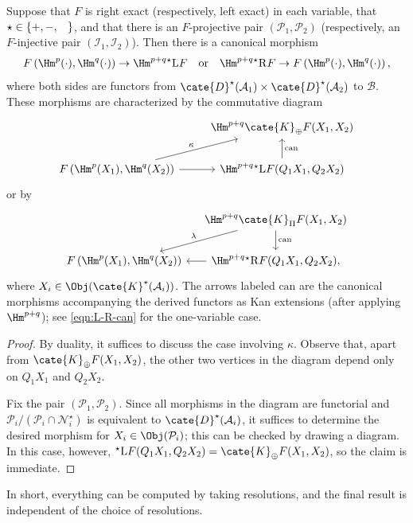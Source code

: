 \begin{proposition}\label{prop:bifunctor-cup}
	Suppose that $F$ is right exact (respectively, left exact) in each variable,
	that $\star\in\{+,-,\hspace{0.8em}\}$, and that there is an $F$-projective
	pair $(\mathcal{P}_1,\mathcal{P}_2)$ (respectively, an $F$-injective pair
	$(\mathcal{I}_1,\mathcal{I}_2)$). Then there is a canonical morphism
	\[ F\left(\Hm^p(\cdot), \Hm^q(\cdot) \right) \to \Hm^{p+q} {}^\star \mathrm{L}F \quad \text{or} \quad \Hm^{p+q} {}^\star \mathrm{R}F \to F\left(\Hm^p(\cdot), \Hm^q(\cdot) \right), \]
	where both sides are functors from
	$\cate{D}^\star(\mathcal{A}_1)\times\cate{D}^\star(\mathcal{A}_2)$ to
	$\mathcal{B}$. These morphisms are characterized by the commutative diagram
	\begin{equation*}
		\begin{tikzcd}
			& \Hm^{p+q} \cate{K}_{\oplus} F(X_1, X_2) \\
			F\left(\Hm^p(X_1), \Hm^q(X_2) \right) \arrow[r] \arrow[ru, "\kappa"] & \Hm^{p+q} {}^\star \mathrm{L}F(Q_1 X_1, Q_2 X_2) \arrow[u, "\mathrm{can}"']
		\end{tikzcd}
	\end{equation*}
	or by
	\begin{equation*}
		\begin{tikzcd}[column sep=small]
			& \Hm^{p+q} \cate{K}_{\Pi} F(X_1, X_2) \arrow[d, "\mathrm{can}"] \arrow[ld, "\lambda"'] \\
			F\left(\Hm^p(X_1), \Hm^q(X_2) \right) & \Hm^{p+q} {}^\star \mathrm{R}F(Q_1 X_1, Q_2 X_2), \arrow[l]
		\end{tikzcd}
	\end{equation*}
	where $X_i\in\Obj(\cate{K}^\star(\mathcal{A}_i))$. The arrows labeled
	$\mathrm{can}$ are the canonical morphisms accompanying the derived
	functors as Kan extensions (after applying $\Hm^{p+q}$); see
	\eqref{eqn:L-R-can} for the one-variable case.
\end{proposition}
\begin{proof}
	By duality, it suffices to discuss the case involving $\kappa$. Observe
	that, apart from $\cate{K}_{\oplus}F(X_1,X_2)$, the other two vertices in
	the diagram depend only on $Q_1X_1$ and $Q_2X_2$.

	Fix the pair $(\mathcal{P}_1,\mathcal{P}_2)$. Since all morphisms in the
	diagram are functorial and
	$\mathcal{P}_i/(\mathcal{P}_i\cap\mathcal{N}^\star_i)$ is equivalent to
	$\cate{D}^\star(\mathcal{A}_i)$, it suffices to determine the desired
	morphism for $X_i\in\Obj(\mathcal{P}_i)$; this can be checked by drawing a
	diagram. In this case, however,
	${}^\star\mathrm{L}F(Q_1X_1,Q_2X_2)=\cate{K}_{\oplus}F(X_1,X_2)$, so the
	claim is immediate.
\end{proof}

In short, everything can be computed by taking resolutions, and the final
result is independent of the choice of resolutions.
